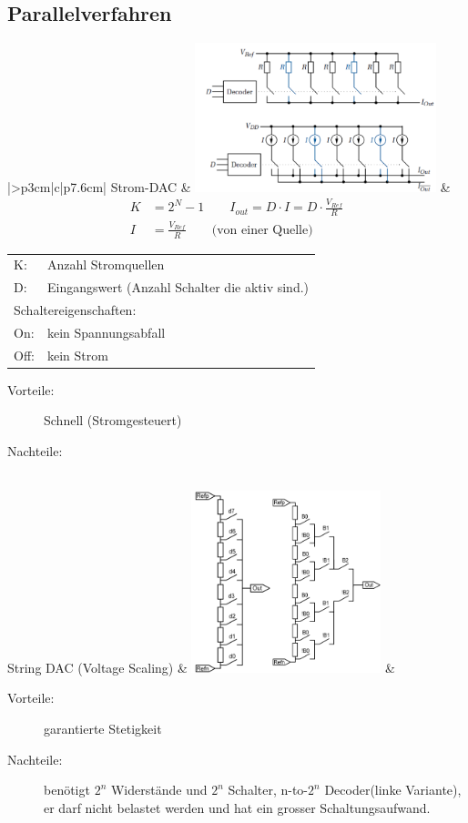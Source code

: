 \subsection{Parallelverfahren}
\renewcommand{\arraystretch}{1}
\begin{longtable}{|>{\bfseries}p{3cm}|c|p{7.6cm}|}
	\hline
	Strom-DAC  
	& \includegraphics[width=7cm, valign=t]{pictures/Strom-DAC}
	& {\begin{align*}
      K &=2^N-1 \qquad I_{out} = D \cdot I = D \cdot \frac{V_{Ref}}{R}\\
      I &=\frac{V_{Ref}}{R} \qquad \text{(von einer Quelle)}
	  \end{align*}}
	  
	  \begin{tabular}{lp{5cm}}
	  	K: & Anzahl Stromquellen \\
      D: & Eingangswert (Anzahl Schalter die aktiv sind.) \\
      \multicolumn{2}{l}{Schaltereigenschaften:}\\
      On: & kein Spannungsabfall  \\
      Off: & kein Strom
    \end{tabular} 
    \begin{description}
  		\item[Vorteile: ] Schnell (Stromgesteuert)
  		\item[Nachteile:] 
	  \end{description} 
	\\ \hline
	String DAC (Voltage Scaling) 
	& \includegraphics[width=5.5cm, valign=t]{pictures/string_DAC}
	& 
		\begin{description}
  		\item[Vorteile: ] garantierte Stetigkeit
  		\item[Nachteile:] benötigt $2^n$ Widerstände und $2^n$ Schalter, n-to-$2^n$ Decoder(linke Variante),
        er darf nicht belastet werden und hat ein grosser Schaltungsaufwand.
	  \end{description} 
    

\end{longtable}
